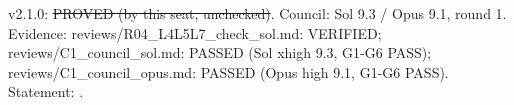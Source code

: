 \begin{proposition}\label{reg:W2-LOC2_F-LOC2}
\end{proposition}
\begin{statusbox}
 v2.1.0: \st{PROVED (by this seat, unchecked)}. Council: Sol 9.3 / Opus 9.1, round 1. Evidence: reviews/R04\_L4L5L7\_check\_sol.md: VERIFIED; reviews/C1\_council\_sol.md: PASSED (Sol xhigh 9.3, G1-G6 PASS); reviews/C1\_council\_opus.md: PASSED (Opus high 9.1, G1-G6 PASS). Statement: .
\end{statusbox}
